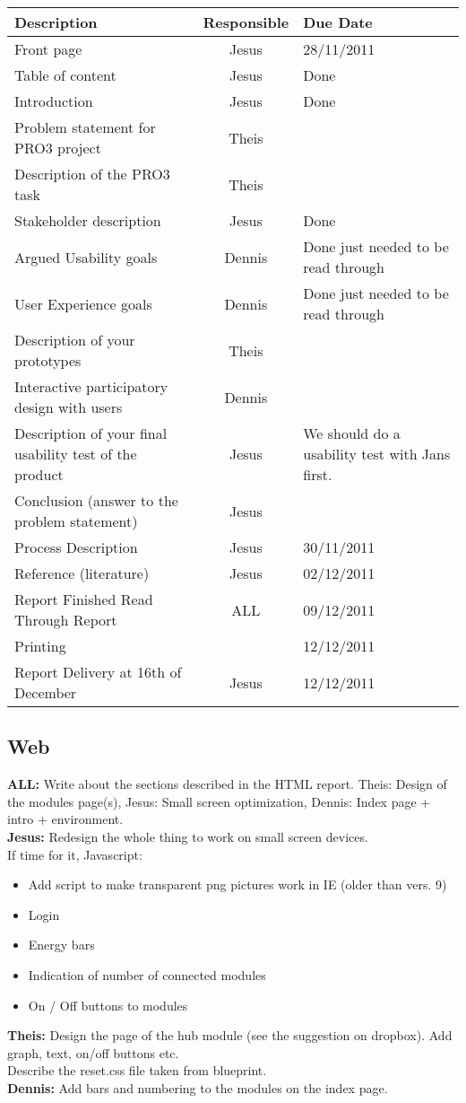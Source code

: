 \documentclass[10pt,a4paper]{article}
\begin{document}
\begin{tabular}{ | p{8cm} | c | p{5cm} |}
\hline
Description & Responsible & Due Date \\ \hline
Front page & Jesus & 28/11/2011\\ \hline
Table of content & Jesus & Done \\ \hline
Introduction & Jesus & Done\\ \hline
Problem statement for PRO3 project & Theis & \\ \hline
Description of the PRO3 task & Theis & \\ \hline
Stakeholder description & Jesus  & Done\\ \hline
Argued Usability goals & Dennis & Done just needed to be read through\\ \hline
User Experience goals &  Dennis  & Done just needed to be read through\\ \hline
Description of your prototypes & Theis & \\ \hline
Interactive participatory design with users & Dennis  & \\ \hline
Description of your final usability test of the product & Jesus & We should do a usability test with Jans first. \\ \hline
Conclusion (answer to the problem statement) & Jesus  & \\ \hline
Process Description & Jesus & 30/11/2011\\ \hline
Reference (literature) & Jesus  &  02/12/2011\\ \hline
Report Finished Read Through Report & ALL & 09/12/2011\\ \hline
Printing &  & 12/12/2011\\ \hline
Report Delivery at 16th of December & Jesus & 12/12/2011 \\ \hline
\hline
\end{tabular}

\subsection{Web}
\textbf{ALL:} Write about the sections described in the HTML report. Theis: Design of the modules page(s), Jesus: Small screen optimization, Dennis: Index page + intro + environment.
\\ \textbf{Jesus:} Redesign the whole thing to work on small screen devices.
\\If time for it, Javascript: 
\begin{itemize}
	\item Add script to make transparent png pictures work in IE (older than vers. 9)
	\item Login
	\item Energy bars
	\item Indication of number of connected modules
	\item On / Off buttons to modules
\end{itemize}
\textbf{Theis:}
Design the page of the hub module (see the suggestion on dropbox). Add graph, text, on/off buttons etc.
\\Describe the reset.css file taken from blueprint.
\\\textbf{Dennis:}
Add bars and numbering to the modules on the index page.
\end{document}

